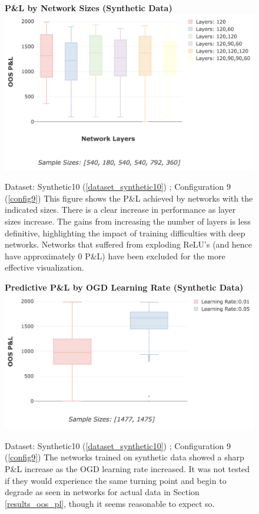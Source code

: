 \documentclass[a4paper,11pt,oneside]{article}
\theoremstyle{plain}
\theoremstyle{definition}
\begin{document}
	\begin{figure}[H]
		\centering 
		\textbf{P\&L by Network Sizes (Synthetic Data)}
		\includegraphics[scale=0.4]{images/results/8_appendix/synth_pl_box.png} 
		\caption[P\&L By Network Sizes (Synthetic Data)]{Dataset: Synthetic10 (\ref{dataset_synthetic10}) ; Configuration 9 (\ref{config9})
			\newline This figure shows the P\&L achieved by networks with the indicated sizes. There is a clear increase in performance as layer sizes increase. The gains from increasing the number of layers is less definitive, highlighting the impact of training difficulties with deep networks. Networks that suffered from exploding ReLU's (and hence have approximately 0 P\&L) have been excluded for the more effective visualization. }
		\label{figure-results_synth_pl_box}
	\end{figure}
	
	\begin{figure}[H]
		\centering 
		\textbf{Predictive P\&L by OGD Learning Rate (Synthetic Data)}
		\includegraphics[scale=0.4]{images/results/8_appendix/synth_ogd_lr.png} 
		\caption[Predictive P\&L by OGD Learning Rate (Synthetic Data)]{Dataset: Synthetic10 (\ref{dataset_synthetic10}) ;  Configuration 9 (\ref{config9}) 
			\newline The networks trained on synthetic data showed a sharp P\&L increase as the OGD learning rate increased. It was not tested if they would experience the same turning point and begin to degrade as seen in networks for actual data in Section \ref{results_oos_pl}, though it seems reasonable to expect so.}
		\label{figure-synth_ogd_lr}
	\end{figure}
	
\end{document}
